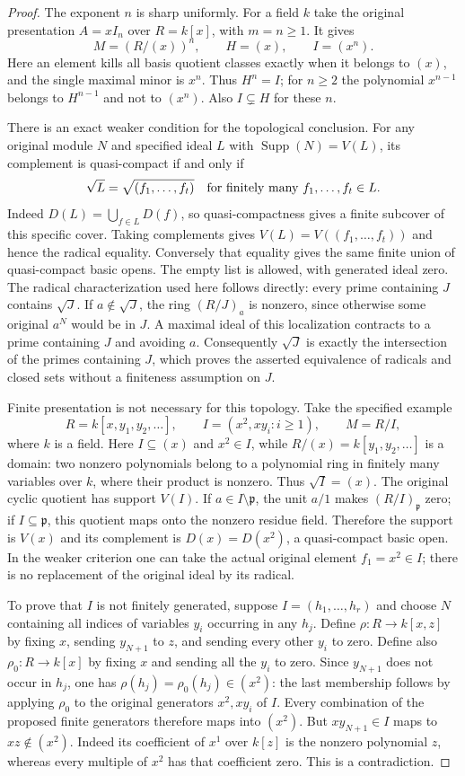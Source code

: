 \begin{proof}
The exponent $n$ is sharp uniformly. For a field $k$
take the original presentation $A=xI_n$ over $R=k[x]$,
with $m=n\geq1$. It gives
$$
M=(R/(x))^n,\qquad H=(x),\qquad I=(x^n).
$$
Here an element kills all basis quotient classes exactly
when it belongs to $(x)$, and the single maximal minor
is $x^n$. Thus $H^n=I$; for $n\geq2$ the polynomial
$x^{n-1}$ belongs to $H^{n-1}$ and not to $(x^n)$.
Also $I\subsetneq H$ for these $n$.

\medskip\noindent
There is an exact weaker condition for the topological
conclusion. For any original module $N$ and specified
ideal $L$ with $\operatorname{Supp}(N)=V(L)$, its
complement is quasi-compact if and only if
$$
\sqrt L=\sqrt{(f_1,\ldots,f_t)}
\quad\hbox{for finitely many }f_1,\ldots,f_t\in L.
$$
Indeed $D(L)=\bigcup_{f\in L}D(f)$, so quasi-compactness
gives a finite subcover of this specific cover. Taking
complements gives $V(L)=V((f_1,\ldots,f_t))$ and hence
the radical equality. Conversely that equality gives the
same finite union of quasi-compact basic opens.
The empty list is allowed, with generated ideal zero.
The radical characterization used here follows directly:
every prime containing $J$ contains $\sqrt J$. If
$a\notin\sqrt J$, the ring $(R/J)_a$ is nonzero, since
otherwise some original $a^N$ would be in $J$.
A maximal ideal of this localization contracts to a prime
containing $J$ and avoiding $a$. Consequently $\sqrt J$
is exactly the intersection of the primes containing $J$,
which proves the asserted equivalence of radicals and
closed sets without a finiteness assumption on $J$.

Finite presentation is not necessary for this topology.
Take the specified example
$$
R=k[x,y_1,y_2,\ldots],\qquad
I=(x^2,xy_i:i\geq1),\qquad M=R/I,
$$
where $k$ is a field. Here $I\subseteq(x)$ and $x^2\in I$,
while $R/(x)=k[y_1,y_2,\ldots]$ is a domain: two
nonzero polynomials belong to a polynomial ring in
finitely many variables over $k$, where their product
is nonzero. Thus $\sqrt I=(x)$.
The original cyclic quotient has support $V(I)$.
If $a\in I\setminus\mathfrak p$, the unit $a/1$
makes $(R/I)_{\mathfrak p}$ zero; if $I\subseteq\mathfrak p$,
this quotient maps onto the nonzero residue field.
Therefore the support is $V(x)$ and its complement
is $D(x)=D(x^2)$, a quasi-compact basic open. In the
weaker criterion one can take the actual original
element $f_1=x^2\in I$; there is no replacement of
the original ideal by its radical.

To prove that $I$ is not finitely generated, suppose
$I=(h_1,\ldots,h_r)$ and choose $N$ containing all
indices of variables $y_i$ occurring in any $h_j$.
Define $\rho:R\to k[x,z]$ by fixing $x$, sending
$y_{N+1}$ to $z$, and sending every other $y_i$ to
zero. Define also $\rho_0:R\to k[x]$ by fixing $x$
and sending all the $y_i$ to zero. Since $y_{N+1}$
does not occur in $h_j$, one has
$\rho(h_j)=\rho_0(h_j)\in(x^2)$: the last membership
follows by applying $\rho_0$ to the original generators
$x^2,xy_i$ of $I$. Every combination of the proposed
finite generators therefore maps into $(x^2)$.
But $xy_{N+1}\in I$ maps to $xz\notin(x^2)$.
Indeed its coefficient of $x^1$ over $k[z]$ is the
nonzero polynomial $z$, whereas every multiple of
$x^2$ has that coefficient zero. This is a contradiction.


\end{proof}
